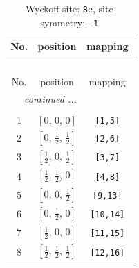 \documentclass[fleqn,8pt]{jsarticle}
\begin{document}
\renewcommand{\arraystretch}{1.2}
\begin{longtable}{ccc}
\caption{Wyckoff site: {\tt 8e}, site symmetry: {\tt -1}}
 \\
 \hline \hline
No. & position & mapping \\ \hline \endfirsthead

\multicolumn{2}{l}{\tablename\ \thetable{}} \\
 \hline \hline
No. & position & mapping \\ \hline \endhead

 \hline \hline
\multicolumn{2}{r}{\footnotesize\it continued ...} \\ \endfoot

 \hline \hline
\multicolumn{2}{r}{} \\ \endlastfoot

1 & $\left[ 0,\, 0,\, 0 \right]$ & {\tt [1,5]} \\ \hline
2 & $\left[ 0,\, \frac{1}{2},\, \frac{1}{2} \right]$ & {\tt [2,6]} \\ \hline
3 & $\left[ \frac{1}{2},\, 0,\, \frac{1}{2} \right]$ & {\tt [3,7]} \\ \hline
4 & $\left[ \frac{1}{2},\, \frac{1}{2},\, 0 \right]$ & {\tt [4,8]} \\ \hline
5 & $\left[ 0,\, 0,\, \frac{1}{2} \right]$ & {\tt [9,13]} \\ \hline
6 & $\left[ 0,\, \frac{1}{2},\, 0 \right]$ & {\tt [10,14]} \\ \hline
7 & $\left[ \frac{1}{2},\, 0,\, 0 \right]$ & {\tt [11,15]} \\ \hline
8 & $\left[ \frac{1}{2},\, \frac{1}{2},\, \frac{1}{2} \right]$ & {\tt [12,16]} \\
\end{longtable}
\renewcommand{\arraystretch}{1.2}
\end{document}
